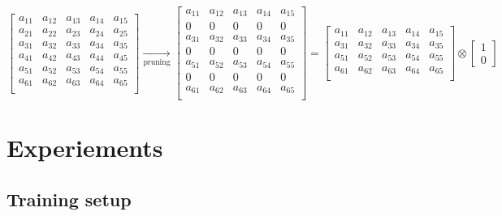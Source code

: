 \documentclass{article}
\begin{document}
{\[
\begin{bmatrix}
a_{11} & a_{12} & a_{13} & a_{14} & a_{15} \\
a_{21} & a_{22} & a_{23} & a_{24} & a_{25} \\
a_{31} & a_{32} & a_{33} & a_{34} & a_{35} \\
a_{41} & a_{42} & a_{43} & a_{44} & a_{45} \\
a_{51} & a_{52} & a_{53} & a_{54} & a_{55} \\
a_{61} & a_{62} & a_{63} & a_{64} & a_{65} \\
\end{bmatrix}
\xrightarrow[\text{pruning}]{}
\begin{bmatrix}
a_{11} & a_{12} & a_{13} & a_{14} & a_{15} \\
0 & 0 & 0 & 0 & 0  \\
a_{31} & a_{32} & a_{33} & a_{34} & a_{35} \\
0 & 0 & 0 & 0 & 0  \\
a_{51} & a_{52} & a_{53} & a_{54} & a_{55} \\
0 & 0 & 0 & 0 & 0  \\
a_{61} & a_{62} & a_{63} & a_{64} & a_{65} \\
\end{bmatrix}
=
\begin{bmatrix}
a_{11} & a_{12} & a_{13} & a_{14} & a_{15} \\
a_{31} & a_{32} & a_{33} & a_{34} & a_{35} \\
a_{51} & a_{52} & a_{53} & a_{54} & a_{55} \\
a_{61} & a_{62} & a_{63} & a_{64} & a_{65} \\
\end{bmatrix}
\otimes
\begin{bmatrix}
1  \\
0  
\end{bmatrix}
 

\]

\section{Experiements}%
\label{sub:Experiements}

\subsection{Training setup}%
\label{sub:Setup}

}
\end{document}
